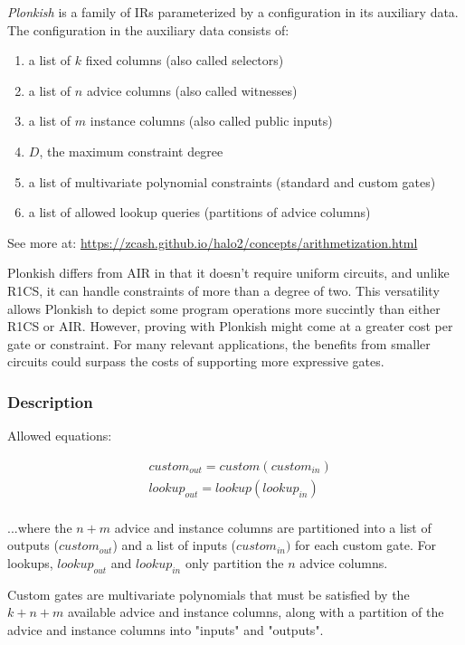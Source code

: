 \documentclass[
    9pt,            %
    techreport,        %
    affiltop,       %
]{art}
\begin{document}
\emph{Plonkish} is a family of IRs parameterized by a configuration in its auxiliary data. The configuration in the auxiliary data consists of:
\begin{enumerate}
    \item a list of $k$ fixed columns (also called selectors)
    \item a list of $n$ advice columns (also called witnesses)
    \item a list of $m$ instance columns (also called public inputs)
    \item $D$, the maximum constraint degree
    \item a list of multivariate polynomial constraints (standard and custom gates)
    \item a list of allowed lookup queries (partitions of advice columns)
\end{enumerate}


See more at: \url{https://zcash.github.io/halo2/concepts/arithmetization.html}

Plonkish differs from AIR in that it doesn't require uniform circuits, and unlike R1CS, it can handle constraints of more than a degree of two. This versatility allows Plonkish to depict some program operations more succintly than either R1CS or AIR. However, proving with Plonkish might come at a greater cost per gate or constraint. For many relevant applications, the benefits from smaller circuits could surpass the costs of supporting more expressive gates.

\subsubsection{Description}

Allowed equations:

\begin{align*}
  & custom_{out} = custom(custom_{in})\\
  & lookup_{out} = lookup(lookup_{in})\\ 
\end{align*}

  
...where the $n+m$ advice and instance columns are partitioned into a list of outputs ($custom_{out}$) and a list of inputs ($custom_{in})$ for each custom gate. For lookups, $lookup_{out}$ and $lookup_{in}$ only partition the $n$ advice columns.
  
  Custom gates are multivariate polynomials that must be satisfied by the $k+n+m$ available advice and instance columns, along with a partition of the advice and instance columns into "inputs" and "outputs".
  
\end{document}
